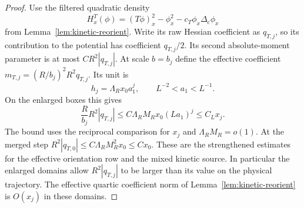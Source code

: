 \documentclass[11pt]{article}
\theoremstyle{definition}
\begin{document}
\begin{proof}
Use the filtered quadratic density
\begin{equation}
 H_x^T(\phi)=(T\phi)_x^2-\phi_x^2-c_T\phi_x\Delta_{\mathrm c}\phi_x
\end{equation}
from Lemma~\ref{lem:kinetic-reorient}. Write its raw Hessian
coefficient as \(q_{T,j}\), so its contribution to the potential
has coefficient \(q_{T,j}/2\). Its second absolute-moment
parameter is at most \(C R^2 |q_{T,j}|\). At scale \(b=b_j\)
define the effective coefficient
\(m_{T,j}=(R/b_j)^2R^2q_{T,j}\).
Its unit is
\begin{equation}
 h_j=\Lambda_Rx_0 a_1^j,\qquad L^{-2}<a_1<L^{-1}.
\end{equation}
On the enlarged boxes this gives
\begin{equation}
 \frac{R}{b_j} R^2|q_{T,j}|
  \le C\Lambda_R M_R x_0 (La_1)^j\le C_Lx_j.
\end{equation}
The bound uses the reciprocal comparison for \(x_j\) and
\(\Lambda_R M_R=o(1)\). At the merged step
\(R^2|q_{T,0}|\le C\Lambda_R M_R^2x_0\le Cx_0\).
These are the strengthened estimates for the effective orientation
row and the mixed kinetic source. In particular the
enlarged domains allow \(R^2|q_{T,j}|\) to be larger than its
value on the physical trajectory. The effective quartic
coefficient norm of Lemma~\ref{lem:kinetic-reorient} is \(O(x_j)\)
in these domains.


\end{proof}
\end{document}
